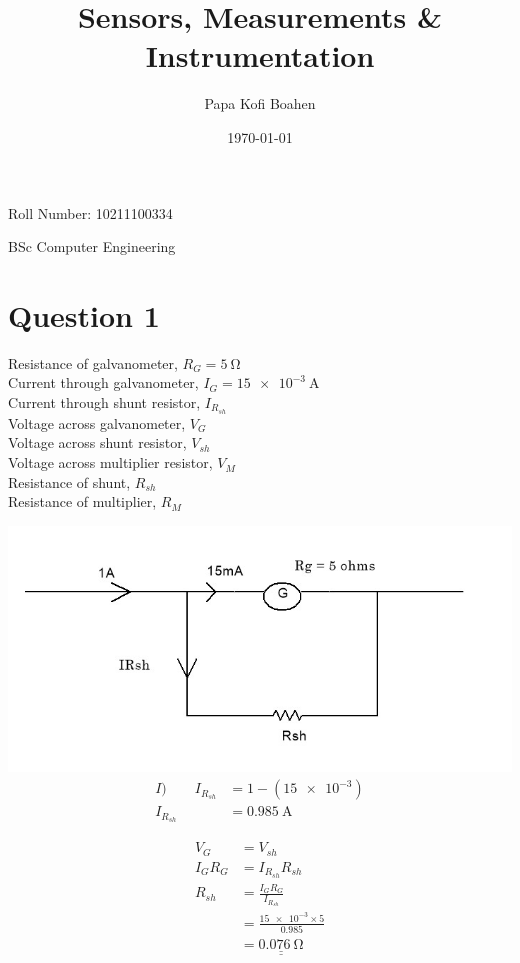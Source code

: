 \documentclass[12pt]{article}
\title{\huge{Sensors, Measurements \& Instrumentation}}
\author{\huge{Papa Kofi Boahen}}
\date{\today}
\begin{document}
	\maketitle
	\huge{Roll Number: 10211100334} \par BSc Computer Engineering
	
\section*{Question 1}
Resistance of galvanometer, $R_{G} = \qty{5}{\ohm}$ 
\\ Current through galvanometer, $I_{G} = \qty{15e-3}{\ampere}$
\\ Current through shunt resistor, $I_{R_{sh}}$
\\ Voltage across galvanometer, $V_{G}$
\\ Voltage across shunt resistor, $V_{sh}$
\\ Voltage across multiplier resistor, $V_{M}$
\\ Resistance of shunt, $R_{sh}$
\\ Resistance of multiplier, $R_{M}$


\includegraphics[width=\textwidth]{ques1i}
\begin{align*}
 I) \qquad		I_{R_{sh}} &= 1 -(\num{15e-3})\\
 		I_{R_{sh}} &= \qty{0.985}{\ampere}
\end{align*}

\begin{align*}
     V_G &= V_{sh} \\
     I_G R_G &= I_{R_{sh}} R_{sh} \\ 
     R_{sh} &= \frac{I_{G} R_{G}}{I_{R_{sh}}} \\
     &= \frac{\num{15e-3}\times 5}{\num{0.985}} \\
     &=\underline{\underline{\qty{0.076}{\ohm}}} \\
\end{align*}
\end{document}
